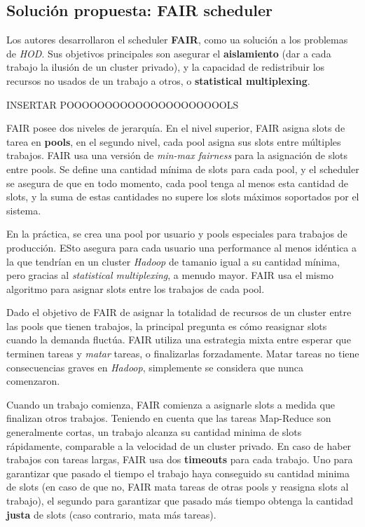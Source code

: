 \subsection{Soluci\'on propuesta: FAIR scheduler}

Los autores desarrollaron el scheduler \textbf{FAIR}, como ua soluci\'on a los problemas de \emph{HOD}. Sus objetivos principales son asegurar el \textbf{aislamiento} (dar a cada trabajo la ilusi\'on de un cluster privado), y la capacidad de redistribuir los recursos no usados de un trabajo a otros, o \textbf{statistical multiplexing}.

\vspace{2mm}

INSERTAR POOOOOOOOOOOOOOOOOOOOOLS

FAIR posee dos niveles de jerarqu\'ia. En el nivel superior, FAIR asigna slots de tarea en \textbf{pools}, en el segundo nivel, cada pool
asigna sus slots entre m\'ultiples trabajos. FAIR usa una versi\'on de \emph{min-max fairness} para la asignaci\'on de slots entre pools. Se define una cantidad m\'inima de slots para cada pool, y el scheduler se asegura de que en todo momento, cada pool tenga al menos esta cantidad de slots, y la suma de estas cantidades no supere los slots m\'aximos soportados por el sistema.

\vspace{2mm}

En la pr\'actica, se crea una pool por usuario y pools especiales para trabajos de producci\'on. ESto asegura para cada usuario una performance al menos id\'entica a la que tendr\'ian en un cluster \emph{Hadoop} de tamanio igual a su cantidad m\'inima, pero gracias al \emph{statistical multiplexing}, a menudo mayor. FAIR usa el mismo algoritmo para asignar slots entre los trabajos de cada pool.

\vspace{2mm}

Dado el objetivo de FAIR de asignar la totalidad de recursos de un cluster entre las pools que tienen trabajos, la principal pregunta es c\'omo reasignar slots cuando la demanda fluct\'ua. FAIR utiliza una estrategia mixta entre esperar que terminen tareas y \emph{matar} tareas, o finalizarlas forzadamente. Matar tareas no tiene consecuencias graves en \emph{Hadoop}, simplemente se considera que nunca comenzaron.

\vspace{2mm}

Cuando un trabajo comienza, FAIR comienza a asignarle slots a medida que finalizan otros trabajos. Teniendo en cuenta que las tareas Map-Reduce son generalmente cortas, un trabajo alcanza su cantidad minima de slots r\'apidamente, comparable a la velocidad de un cluster privado.
En caso de haber trabajos con tareas largas, FAIR usa dos \textbf{timeouts} para cada trabajo. Uno para garantizar que pasado el tiempo el trabajo haya conseguido su cantidad minima de slots (en caso de que no, FAIR mata tareas de otras pools y reasigna slots al trabajo), el segundo para garantizar que pasado m\'as tiempo obtenga la cantidad \textbf{justa} de slots (caso contrario, mata m\'as tareas).

